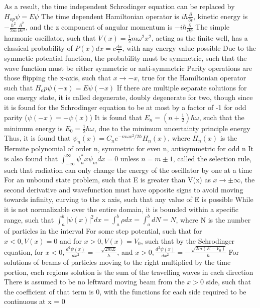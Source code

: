 \documentclass[11 pt, twoside]{article}
\newenvironment{outline*}
{
	\begin{outline}[enumerate]
	}
	{\end{outline}
}
\begin{document}
\begin{outline*}
			\4 As a result, the time independent Schrodinger equation can be replaced by $H_{op}\psi = E\psi$
		\3 The time dependent Hamiltonian operator is $i\hbar \frac{\partial}{\partial t}$, kinetic energy is $-\frac{\hbar^2}{2m}\frac{\partial^2}{\partial x^2}$, and the z component of angular momentum is $-i\hbar \frac{\partial}{\partial \phi}$
\1 The simple harmonic oscillator, such that $V(x) = \frac{1}{2}m\omega^2x^2$, acting as the finite well, has a classical probability of $P(x)dx = c\frac{dx}{v}$, with any energy value possible
	\2 Due to the symmetic potential function, the probability must be symmetric, such that the wave function must be either symmetric or anti-symmetric
		\3 Parity operations are those flipping the x-axis, such that $x \to -x$, true for the Hamiltonian operator such that $H_op\psi(-x) = E\psi(-x)$
		\3 If there are multiple separate solutions for one energy state, it is called degenerate, doubly degenerate for two, though since it is found for the Schrodinger equation to be at most by a factor of -1 for odd parity ($\psi(-x) = -\psi(x)$)
	\2 It is found that $E_n = (n + \frac{1}{2})\hbar\omega$, such that the minimum energy is $E_0 = \frac{1}{2}\hbar\omega$, due to the minimum uncertainty principle energy
		\3 Thus, it is found that $\psi_n(x) = C_n e^{-m\omega x^2/2\hbar}H_n(x)$, where $H_n(x)$ is the Hermite polynomial of order n, symmetric for even n, antisymmetric for odd n
	\2 It is also found that $\int^{\infty}_{-\infty} \psi^*_nx\psi_mdx = 0$ unless $n = m \pm 1$, called the selection rule, such that radiation can only change the energy of the oscillator by one at a time
\1 For an unbound state problem, such that E is greater than V(x) as $x \to \pm \infty$, the second derivative and wavefunction must have opposite signs to avoid moving towards infinity, curving to the x axis, such that any value of E is possible
	\2 While it is not normalizable over the entire domain, it is bounded within a specific range, such that $\int^b_a |\psi(x)|^2dx = \int^b_a \rho dx = \int^b_a dN = N$, where N is the number of particles in the interval
	\2 For some step potential, such that for $x < 0, V(x) = 0$ and for $x > 0, V(x) = V_0$, such that by the Schrodinger equation, for $x < 0, \frac{d^2\psi(x)}{dx^2} = -\frac{\sqrt{2mE}}{\hbar}$, and $x > 0, \frac{d^2\psi(x)}{dx^2} = -\frac{\sqrt{2m(E - V_0)}}{\hbar}$
		\3 For solutions of beams of particles moving to the right multiplied by the time portion, each regions solution is the sum of the travelling waves in each direction
		\3 There is assumed to be no leftward moving beam from the $x > 0$ side, such that the coefficient of that term is 0, with the functions for each side required to be continuous at x = 0

\end{outline*}
\end{document}
